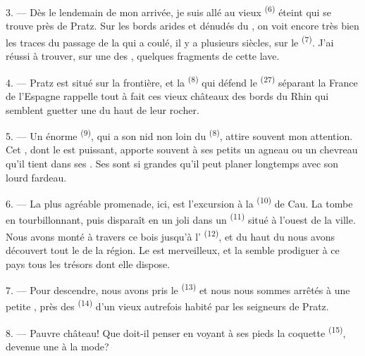 \VUsaut{3.0mm}
\VUsaut{3.0mm}

3. --- Dès le lendemain de mon arrivée, je suis allé au vieux 
\textsuperscript{(6)} éteint qui se trouve près de Pratz. Sur les bords arides
et dénudés du , on voit encore très bien les traces du passage
de la  qui a coulé, il y a plusieurs siècles, sur le  \textsuperscript{(7)}. J'ai réussi à trouver, sur une des
, quelques fragments de cette lave.

4. --- Pratz est situé sur la frontière, et la 
\textsuperscript{(8)} qui défend le  \textsuperscript{(27)} séparant
la France de l'Espagne rappelle tout à fait ces vieux châteaux des bords du Rhin
qui semblent guetter une  du haut de leur rocher.

5. --- Un énorme  \textsuperscript{(9)}, qui a son nid non loin du
 \textsuperscript{(8)}, attire souvent mon attention. Cet
, dont le  est puissant, apporte souvent à
ses petits un agneau ou un chevreau qu'il tient dans ses . Ses
 sont si grandes qu'il peut planer longtemps avec son lourd
fardeau.

\VUsaut{3.0mm}
\VUsaut{3.0mm}

6. --- La plus agréable promenade, ici, est l'excursion à la 
\textsuperscript{(10)} de Cau. La  tombe en tourbillonnant,
puis disparaît en un joli  dans un 
\textsuperscript{(11)} situé à l'ouest de la ville. Nous avons monté à travers
ce bois jusqu'à l' \textsuperscript{(12)},
et du haut du  nous avons découvert tout le 
de la région. Le  est merveilleux, et la  semble
prodiguer à ce pays tous les trésors dont elle dispose.

7. --- Pour descendre, nous avons pris le 
\textsuperscript{(13)} et nous nous sommes arrêtés à une petite
, près des  \textsuperscript{(14)} d'un vieux
 autrefois habité par les seigneurs de Pratz.

8. --- Pauvre château! Que doit-il penser en voyant à ses pieds la coquette
 \textsuperscript{(15)}, devenue une  à la mode?

